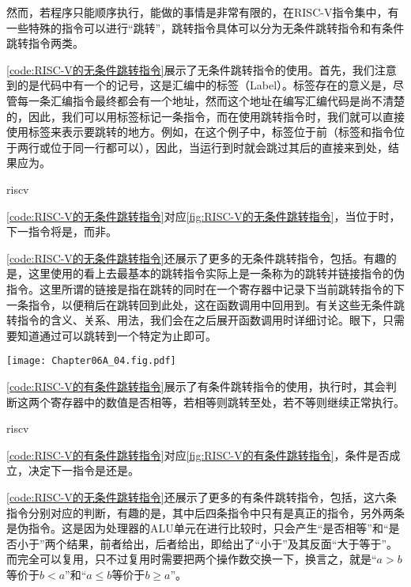 然而，若程序只能顺序执行，能做的事情是非常有限的，在RISC-V指令集中，有一些特殊的指令可以进行“跳转”，跳转指令具体可以分为无条件跳转指令和有条件跳转指令两类。

\cref{code:RISC-V的无条件跳转指令}展示了无条件跳转指令的使用。首先，我们注意到的是代码中有一个的记号，这是汇编中的标签（Label）。标签存在的意义是，尽管每一条汇编指令最终都会有一个地址，然而这个地址在编写汇编代码是尚不清楚的，因此，我们可以用标签标记一条指令，而在使用跳转指令时，我们就可以直接使用标签来表示要跳转的地方。例如，在这个例子中，标签位于前（标签和指令位于两行或位于同一行都可以），因此，当运行到时就会跳过其后的直接来到处，结果应为。

\begin{Code}{riscv}
    
\end{Code}

\cref{code:RISC-V的无条件跳转指令}对应\cref{fig:RISC-V的无条件跳转指令}，当位于时，下一指令将是，而非。

\cref{code:RISC-V的无条件跳转指令}还展示了更多的无条件跳转指令，包括。有趣的是，这里使用的看上去最基本的跳转指令实际上是一条称为的跳转并链接指令的伪指令。这里所谓的链接是指在跳转的同时在一个寄存器中记录下当前跳转指令的下一条指令，以便稍后在跳转回到此处，这在函数调用中回用到。有关这些无条件跳转指令的含义、关系、用法，我们会在之后展开函数调用时详细讨论。眼下，只需要知道通过可以跳转到一个特定为止即可。
\begin{Figure}
    \texttt{[image: Chapter06A\_04.fig.pdf]}
\end{Figure}

\cref{code:RISC-V的有条件跳转指令}展示了有条件跳转指令的使用，执行时，其会判断这两个寄存器中的数值是否相等，若相等则跳转至处，若不等则继续正常执行。
\begin{Code}{riscv}
    
\end{Code}

\cref{code:RISC-V的有条件跳转指令}对应\cref{fig:RISC-V的有条件跳转指令}，条件是否成立，决定下一指令是还是。

\cref{code:RISC-V的无条件跳转指令}还展示了更多的有条件跳转指令，包括，这六条指令分别对应\code{==,!=,<,<=,>,>=}的判断，有趣的是，其中后四条指令中只有是真正的指令，另外两条是伪指令。这是因为处理器的ALU单元在进行比较时，只会产生“是否相等”和“是否小于”两个结果，前者给出，后者给出，即给出了“小于”及其反面“大于等于”。而完全可以复用，只不过复用时需要把两个操作数交换一下，换言之，就是“$a>b$等价于$b<a$”和“$a\leq b$等价于$b\geq a$”。

